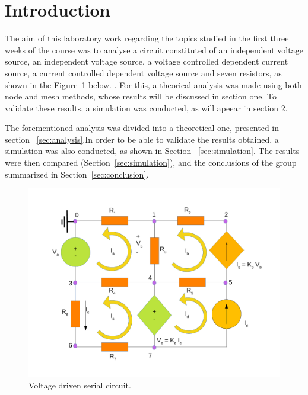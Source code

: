 \section{Introduction}
\label{sec:introduction}

The aim of this laboratory work regarding the topics studied in the first three weeks of the course was to analyse a circuit constituted of an independent voltage source, an independent voltage source, a voltage controlled dependent current source, a current controlled dependent voltage source and seven resistors, as shown in the Figure~\ref{fig:t1draw} below.
. For this, a theorical analysis was made using both node and mesh methods, whose results will be discussed in section one. To validate these results, a simulation was conducted, as will apeear in section 2.


The forementioned analysis was divided into a theoretical one, presented in section ~\ref{sec:analysis}.In order to be able to validate the results obtained, a simulation was also conducted, as shown in Section ~\ref{sec:simulation}. The results were then compared (Section~\ref{sec:simulation}), and the conclusions of the group summarized in Section~\ref{sec:conclusion}.


\begin{figure}[h] \centering
\includegraphics[width=0.4\linewidth]{t1draw.pdf}
\caption{Voltage driven serial circuit.}
\label{fig:t1draw}
\end{figure}

